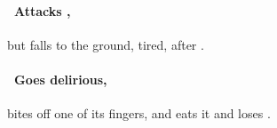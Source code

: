 \documentclass[10pt,twoside]{book}
\begin{document}
\paragraph{\Square~Attacks ,}
but falls to the ground, tired, after .

\paragraph{\Square~Goes delirious,}
bites off one of its fingers, and eats it and loses .


\end{document}
